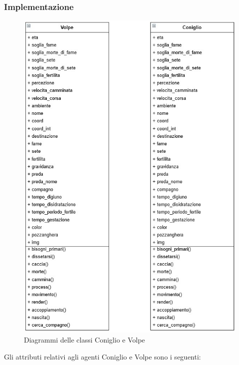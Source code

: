 \documentclass[11pt]{article}
\begin{document}
\subsubsection{Implementazione}
\begin{figure}[h!]
     \centering
     \includegraphics[scale = 0.7]{Animale.png}
     \caption{Diagrammi delle classi Coniglio e Volpe}
     \label{fig:ConiglioVolpeUML}
\end{figure}
Gli attributi relativi agli agenti Coniglio e Volpe sono i seguenti: 
\end{document}
